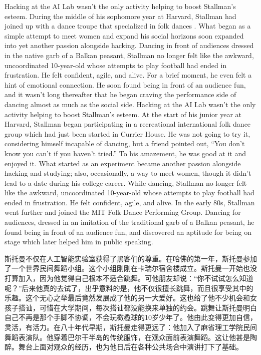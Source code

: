 \ifdefined\eng
\ifdefined\vone
Hacking at the AI Lab wasn't the only activity helping to boost Stallman's esteem. During the middle of his sophomore year at Harvard, Stallman had joined up with a dance troupe that specialized in folk dances . What began as a simple attempt to meet women and expand his social horizons soon expanded into yet another passion alongside hacking. Dancing in front of audiences dressed in the native garb of a Balkan peasant, Stallman no longer felt like the awkward, uncoordinated 10-year-old whose attempts to play football had ended in frustration. He felt confident, agile, and alive. For a brief moment, he even felt a hint of emotional connection. He soon found being in front of an audience fun, and it wasn't long thereafter that he began craving the performance side of dancing almost as much as the social side.
\fi
\ifdefined\vtwo
Hacking at the AI Lab wasn't the only activity helping to boost Stallman's esteem. At the start of his junior year at Harvard, Stallman began participating in a recreational international folk dance group which had just been started in Currier House. He was not going to try it, considering himself incapable of dancing, but a friend pointed out, ``You don't know you can't if you haven't tried.'' To his amazement, he was good at it and enjoyed it. What started as an experiment became another passion alongside hacking and studying; also, occasionally, a way to meet women, though it didn't lead to a date during his college career.  While dancing, Stallman no longer felt like the awkward, uncoordinated 10-year-old whose attempts to play football had ended in frustration. He felt confident, agile, and alive. In the early 80s, Stallman went further and joined the MIT Folk Dance Performing Group.   Dancing for audiences, dressed in an imitation of the traditional garb of a Balkan peasant, he found being in front of an audience fun, and discovered an aptitude for being on stage which later helped him in public speaking.
\fi
\fi

\ifdefined\chs
斯托曼不仅在人工智能实验室获得了黑客们的尊重。在哈佛的第一年，斯托曼参加了一个世界民间舞蹈小组。这个小组刚刚在卡瑞尔宿舍楼成立。斯托曼一开始也没打算加入，因为他觉得自己根本不适合跳舞。可他朋友却说：``你不试试怎么知道呢？''后来他真的去试了，出乎意料的是，他不仅很擅长跳舞，而且很享受其中的乐趣。这个无心之举最后竟然发展成了他的另一大爱好。这也给了他不少机会和女孩子搭讪，可惜在大学期间，每次搭讪都没能换来单独的约会。跳舞让斯托曼明白自己不再是那个手脚不协调，不会玩橄榄球的10岁少年了。他由此变得更加自信，灵活，有活力。在八十年代早期，斯托曼走得更远了：他加入了麻省理工学院民间舞蹈表演队。他穿着巴尔干半岛的传统服饰，在观众面前表演舞蹈。这让他甚是陶醉。舞台上面对观众的经历，也为他日后在各种公共场合中演讲打下了基础。
\fi

